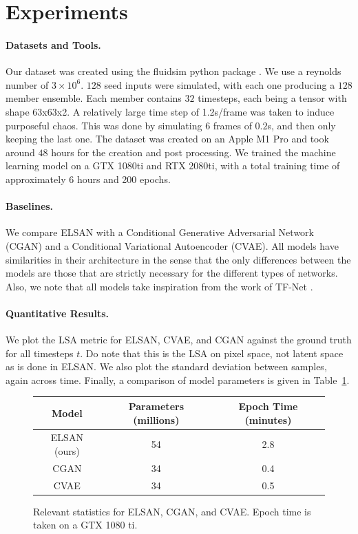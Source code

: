 \documentclass{article}
\begin{document}
\section{Experiments}
\paragraph{Datasets and Tools.}
Our dataset was created using the fluidsim python package \cite{fluiddyn, fluidfft, fluidsim}. We use a reynolds number of $3 \times 10^6$. $128$ seed inputs were simulated, with each one producing a $128$ member ensemble. Each member contains $32$ timesteps, each being a tensor with shape 63x63x2. A relatively large time step of 1.2s/frame was taken to induce purposeful chaos. This was done by simulating $6$ frames of $0.2$s, and then only keeping the last one. The dataset was created on an Apple M1 Pro and took around $48$ hours for the creation and post processing. We trained the machine learning model on a GTX 1080ti and RTX 2080ti, with a total training time of approximately 6 hours and 200 epochs.
\paragraph{Baselines.}
We compare ELSAN with a Conditional Generative Adversarial Network (CGAN) and a Conditional Variational Autoencoder (CVAE)\cite{doersch2021tutorial, kingma2022autoencoding, goodfellow2014generative}. All models have similarities in their architecture in the sense that the only differences between the models are those that are strictly necessary for the different types of networks. Also, we note that all models take inspiration from the work of TF-Net \cite{Wang2020TF}.

\paragraph{Quantitative Results.}
We plot the LSA metric for ELSAN, CVAE, and CGAN against the ground truth for all timesteps $t$. Do note that this is the LSA on pixel space, not latent space as is done in ELSAN. We also plot the standard deviation between samples, again across time. Finally, a comparison of model parameters is given in Table~\ref{modelparams}.

\begin{figure}
    \centering
    \caption{Relevant statistics for ELSAN, CGAN, and CVAE. Epoch time is taken on a GTX 1080 ti.}
    \label{modelparams}
    \begin{tabular}{|c|c|c|}
        \hline
        Model & Parameters (millions) & Epoch Time (minutes) \\
        \hline
        ELSAN (ours) & 54 & 2.8\\
        \hline
        CGAN & 34 & 0.4 \\
        \hline
        CVAE & 34 & 0.5 \\
        \hline
    \end{tabular}
\end{figure}
\end{document}

